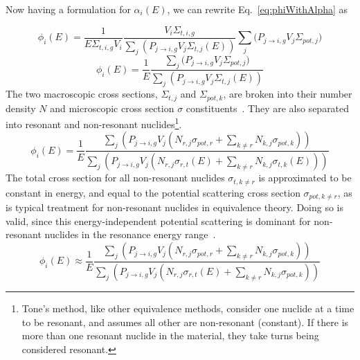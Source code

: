 \documentclass[10pt]{article}
\begin{document}
Now having a formulation for $\alpha_i(E)$, we can rewrite Eq.~\ref{eq:phiWithAlpha} as


\begin{equation}\phi_{i}(E)=\frac{1}{E\Sigma_{t,i,g}V_i}\frac{V_i\Sigma_{t,i,g}}{\sum\limits_{j}\left(P_{j\rightarrow i,g}V_{j}\Sigma_{t,j}(E)\right)}\sum\limits_j\Big(P_{j\rightarrow i,g}V_{j}\Sigma_{pot,j}\Big)\end{equation}
\begin{equation}\phi_{i}(E)=\frac{1}{E}\frac{\sum\limits_j\Big(P_{j\rightarrow i,g}V_{j}\Sigma_{pot,j}\Big)}{\sum\limits_{j}\left(P_{j\rightarrow i,g}V_{j}\Sigma_{t,j}(E)\right)}\end{equation}
  The two macroscopic cross sections, $\Sigma_{t,j}$ and $\Sigma_{pot,k}$, are broken into their number density $N$ and microscopic cross section $\sigma$ constituents~\cite{ch9}. They are also separated into resonant and non-resonant nuclides\footnote{Tone's method, like other equivalence methods, consider one nuclide at a time to be resonant, and assumes all other are non-resonant (constant). If there is more than one resonant nuclide in the material, they take turns being considered resonant.}. 
\begin{equation}\phi_{i}(E)=\frac{1}{E}\frac{\sum\limits_j\left(P_{j\rightarrow i,g}V_{j}\left(N_{r,j}\sigma_{pot,r}+\sum\limits_{k\neq r}N_{k,j}\sigma_{pot,k}\right)\right)}{\sum\limits_{j}\left(P_{j\rightarrow i,g}V_{j}\left(N_{r,j}\sigma_{r,t}(E)+\sum\limits_{k\neq r}N_{k,j}\sigma_{t,k}(E)\right)\right)}\end{equation}
  The total cross section for all non-resonant nuclides $\sigma_{t,k\neq r}$ is approximated to be constant in energy, and equal to the potential scattering cross section $\sigma_{pot,k\neq r}$, as is typical treatment for non-resonant nuclides in equivalence theory. Doing so is valid, since this energy-independent potential scattering is dominant for non-resonant nuclides in the resonance energy range~\cite{ch9}.
\begin{equation}\phi_{i}(E)\approx\frac{1}{E}\frac{\sum\limits_j\left(P_{j\rightarrow i,g}V_{j}\left(N_{r,j}\sigma_{pot,r}+\sum\limits_{k\neq r}N_{k,j}\sigma_{pot,k}\right)\right)}{\sum\limits_{j}\left(P_{j\rightarrow i,g}V_{j}\left(N_{r,j}\sigma_{r,t}(E)+\sum\limits_{k\neq r}N_{k,j}\sigma_{pot,k}\right)\right)}\label{eq:almost}\end{equation}
\end{document}
